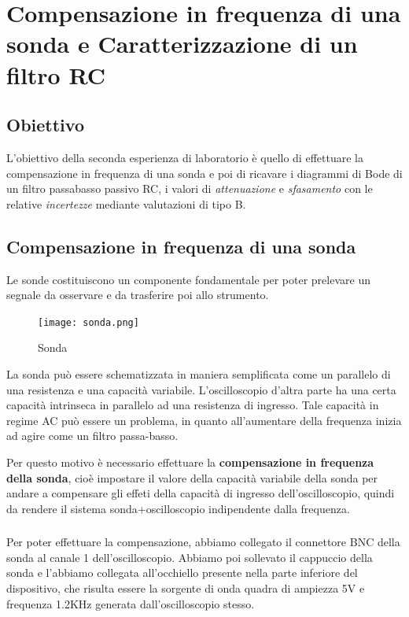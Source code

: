 \chapter{Compensazione in frequenza di una sonda  e Caratterizzazione di un filtro RC}
\label{chap:seconda_prova}

\section*{Obiettivo}
\label{sec:ob_second}
L'obiettivo della seconda esperienza di laboratorio è quello di effettuare la compensazione in frequenza di una sonda e poi di ricavare i diagrammi di Bode di un filtro passabasso passivo RC, i valori di \emph{attenuazione} e \emph{sfasamento} con le relative \emph{incertezze} mediante valutazioni di tipo B.

\section{Compensazione in frequenza di una sonda}
Le sonde costituiscono un componente fondamentale per poter prelevare un segnale da osservare e da trasferire poi allo strumento.

\begin{figure}[h]
    \centering
    \texttt{[image: sonda.png]}
    \caption{Sonda}
    \label{fig:sonda}
\end{figure}

La sonda può essere schematizzata in maniera semplificata come un parallelo di una resistenza e una capacità variabile. L'oscilloscopio d'altra parte ha una certa capacità intrinseca in parallelo ad una resistenza di ingresso. Tale capacità in regime AC può essere un problema, in quanto all'aumentare della frequenza inizia ad agire come un filtro passa-basso.

Per questo motivo è necessario effettuare la \textbf{compensazione in frequenza della sonda}, cioè impostare il valore della capacità variabile della sonda per andare a compensare gli effeti della capacità di ingresso dell'oscilloscopio, quindi da rendere il sistema sonda+oscilloscopio indipendente dalla frequenza.

\subsection*{}
Per poter effettuare la compensazione, abbiamo collegato il connettore BNC della sonda al canale 1 dell'oscilloscopio. Abbiamo poi sollevato il cappuccio della sonda e l'abbiamo collegata all'occhiello presente nella parte inferiore del dispositivo, che risulta essere la sorgente di onda quadra di ampiezza 5V e frequenza 1.2KHz generata dall'oscilloscopio stesso.

